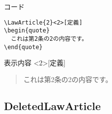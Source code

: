 \documentclass[oneside,10pt,a4paper]{jsarticle}
\begin{document}
\begin{itemize}
      \begin{itembox}[l]{コード}
        {\footnotesize\begin{verbatim}
\LawArticle{2}<2>[定義]
\begin{quote}
  これは第2条の2の内容です。
\end{quote}\end{verbatim}}
      \end{itembox}
      \begin{itembox}[l]{表示内容}
        <2>[定義]
        \begin{quote}
          これは第2条の2の内容です。
        \end{quote}
      \end{itembox}
  \end{itemize}

  \subsection{DeletedLawArticle}
\end{document}
